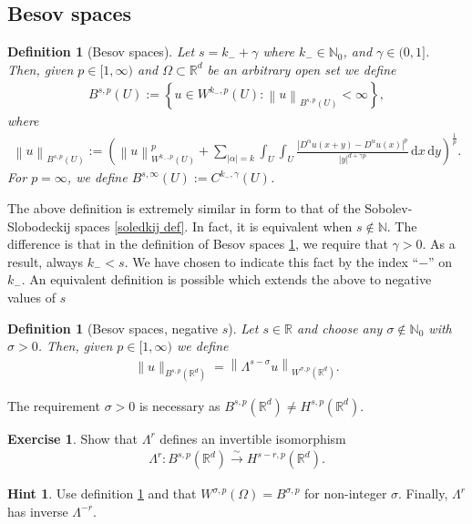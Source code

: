 \documentclass[
    a4paper,
    DIV=14,
    abstract=true,
    numbers=noenddot
]
{scrartcl}
\newtheorem{definition}[theorem]{Definition}
\theoremstyle{definition}
\newtheorem{exercise}{Exercise}
\newtheorem*{hint}{Hint}
\newcommand{\set}[1]{\left\{#1\right\}}
\renewcommand{\norm}[1]{\left\lVert #1 \right\rVert}\renewcommand{\abs}[1]{\left| #1 \right|}
\newcommand{\iso}{\xrightarrow{\sim}}
\renewcommand{\d}{\,\mathrm{d}}\newcommand{\dx}{\,\mathrm{d}x}
\newcommand{\N}{\mathbb{N}}
\newcommand{\R}{\mathbb{R}}
\begin{document}
\subsection{Besov spaces}
\begin{definition}[Besov spaces]\label{besov def}
    Let $s=k_{-}+\gamma$ where $k_{-} \in \N_0$, and $\gamma \in (0,1]$. Then, given  $p \in [1,\infty)$ and $\Omega  \subset \R^d$ be an arbitrary open set we define
    \begin{align*}
        B^{s ,p}(U):= \set{u \in W^{k_{-} ,p}(U): \norm{u}_{B^{s,p}(U)}<\infty},
    \end{align*}
    where
    \begin{align*}
        \norm{u}_{B^{s,p}(U)}:= \left(\norm{u}_{W^{k_{-},p}(U)}^p+ \sum_{\abs{\alpha}=k }\int_{U}\int_{U}\frac{\abs{D^\alpha u(x+y)-D^\alpha u(x)}^p}{\abs{y}^{d+\gamma p}}\d x \d y\right)^\frac{1}{p}.
    \end{align*}
    For $p = \infty$, we define $B^{s,\infty}(U):= C^{k_{-},\gamma}(U)$.
\end{definition}
The above definition is extremely similar in form to that of the Sobolev-Slobodeckij spaces \ref{soledkij def}. In fact, it is equivalent when $s \notin \N$. The difference is that in the definition of Besov spaces \ref{besov def}, we require that $\gamma >0$. As a result, always $k_{-}<s$. We have chosen to indicate this fact by the index ``$-$'' on $k_{-}$. An equivalent definition is possible which extends the above to negative values of $s$
\begin{definition}[Besov spaces, negative $s$]\label{besov def negative}
    Let $s \in \R$ and choose any $\sigma \not\in \N_0$ with $\sigma >0$. Then, given  $p \in [1,\infty)$ we define
    \begin{align*}
        \|u\|_{B^{s,p}(\R^d)}=\left\|\Lambda^{s-\sigma} u\right\|_{W^{\sigma,p}(\R^d)}.
    \end{align*}
\end{definition}
The requirement $\sigma >0$ is necessary as $B^{s,p}(\R^d)\neq H^{s,p}(\R^d)$.
\begin{exercise}
    Show that $\Lambda ^r$ defines an invertible isomorphism
    \begin{align*}
        \Lambda ^r: B^{s,p}(\R^d)\iso H^{s-r,p}(\R^d).
    \end{align*}
\end{exercise}
\begin{hint}
    Use definition \ref{besov def negative} and that $W^{\sigma,p}(\Omega )= B^{\sigma,p } $ for non-integer $\sigma$. Finally,   $\Lambda^r$ has inverse $\Lambda^{-r}$.
\end{hint}
\end{document}

